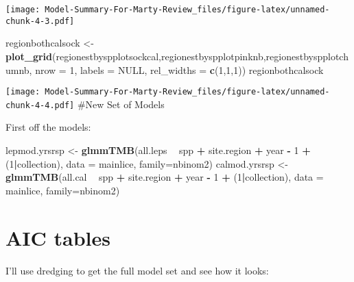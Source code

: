 \documentclass[]{article}
\newenvironment{Shaded}{\begin{snugshade}}{\end{snugshade}}
\newcommand{\KeywordTok}[1]{\textcolor[rgb]{0.13,0.29,0.53}{\textbf{#1}}}
\newcommand{\DataTypeTok}[1]{\textcolor[rgb]{0.13,0.29,0.53}{#1}}
\newcommand{\DecValTok}[1]{\textcolor[rgb]{0.00,0.00,0.81}{#1}}
\newcommand{\StringTok}[1]{\textcolor[rgb]{0.31,0.60,0.02}{#1}}
\newcommand{\OtherTok}[1]{\textcolor[rgb]{0.56,0.35,0.01}{#1}}
\newcommand{\OperatorTok}[1]{\textcolor[rgb]{0.81,0.36,0.00}{\textbf{#1}}}
\newcommand{\NormalTok}[1]{#1}
\begin{document}
\texttt{[image: Model-Summary-For-Marty-Review\_files/figure-latex/unnamed-chunk-4-3.pdf]}

\begin{Shaded}
\begin{Highlighting}[]
\NormalTok{regionbothcalsock <-}\StringTok{ }\KeywordTok{plot_grid}\NormalTok{(regionestbyspplotsockcal,regionestbyspplotpinknb,regionestbyspplotchumnb,}
                          \DataTypeTok{nrow =} \DecValTok{1}\NormalTok{, }\DataTypeTok{labels =} \OtherTok{NULL}\NormalTok{, }\DataTypeTok{rel_widths =} \KeywordTok{c}\NormalTok{(}\DecValTok{1}\NormalTok{,}\DecValTok{1}\NormalTok{,}\DecValTok{1}\NormalTok{)) }
\NormalTok{regionbothcalsock}
\end{Highlighting}
\end{Shaded}

\texttt{[image: Model-Summary-For-Marty-Review\_files/figure-latex/unnamed-chunk-4-4.pdf]}
\#New Set of Models

First off the models:

\begin{Shaded}
\begin{Highlighting}[]
\NormalTok{lepmod.yrsrsp <-}\StringTok{ }\KeywordTok{glmmTMB}\NormalTok{(all.leps }\OperatorTok{~}\StringTok{ }\NormalTok{spp }\OperatorTok{+}\StringTok{ }\NormalTok{site.region }\OperatorTok{+}\StringTok{ }\NormalTok{year }\OperatorTok{-}\StringTok{ }\DecValTok{1} \OperatorTok{+}\StringTok{ }\NormalTok{(}\DecValTok{1}\OperatorTok{|}\NormalTok{collection), }
                      \DataTypeTok{data =}\NormalTok{ mainlice, }\DataTypeTok{family=}\NormalTok{nbinom2)}
\NormalTok{calmod.yrsrsp <-}\StringTok{ }\KeywordTok{glmmTMB}\NormalTok{(all.cal }\OperatorTok{~}\StringTok{ }\NormalTok{spp }\OperatorTok{+}\StringTok{ }\NormalTok{site.region }\OperatorTok{+}\StringTok{ }\NormalTok{year }\OperatorTok{-}\StringTok{ }\DecValTok{1} \OperatorTok{+}\StringTok{ }\NormalTok{(}\DecValTok{1}\OperatorTok{|}\NormalTok{collection), }
                      \DataTypeTok{data =}\NormalTok{ mainlice, }\DataTypeTok{family=}\NormalTok{nbinom2)}
\end{Highlighting}
\end{Shaded}

\section{AIC tables}\label{aic-tables-1}

I'll use dredging to get the full model set and see how it looks:
\end{document}
